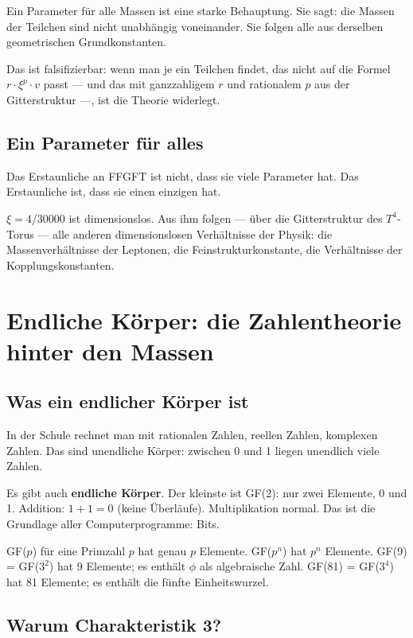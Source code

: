 \documentclass[12pt,oneside]{book}
\begin{document}
Ein Parameter für alle Massen ist eine starke Behauptung. Sie sagt: die Massen der Teilchen sind nicht unabhängig voneinander. Sie folgen alle aus derselben geometrischen Grundkonstanten.

Das ist falsifizierbar: wenn man je ein Teilchen findet, das nicht auf die Formel $r \cdot \xi^p \cdot v$ passt — und das mit ganzzahligem $r$ und rationalem $p$ aus der Gitterstruktur —, ist die Theorie widerlegt.

\section{Ein Parameter für alles}

Das Erstaunliche an FFGFT ist nicht, dass sie viele Parameter hat. Das Erstaunliche ist, dass sie einen einzigen hat.

$\xi = 4/30000$ ist dimensionslos. Aus ihm folgen — über die Gitterstruktur des $T^4$-Torus — alle anderen dimensionslosen Verhältnisse der Physik: die Massenverhältnisse der Leptonen, die Fein\-struktur\-konstante, die Verhältnisse der Kopplungskonstanten.

\chapter{Endliche Körper: die Zahlentheorie hinter den Massen}

\section{Was ein endlicher Körper ist}

In der Schule rechnet man mit rationalen Zahlen, reellen Zahlen, komplexen Zahlen. Das sind unendliche Körper: zwischen 0 und 1 liegen unendlich viele Zahlen.

Es gibt auch \textbf{endliche Körper}. Der kleinste ist GF(2): nur zwei Elemente, 0 und 1. Addition: $1 + 1 = 0$ (keine Überläufe). Multiplikation normal. Das ist die Grundlage aller Computerprogramme: Bits.

GF($p$) für eine Primzahl $p$ hat genau $p$ Elemente. GF($p^n$) hat $p^n$ Elemente. GF(9) = GF($3^2$) hat 9 Elemente; es enthält $\phi$ als algebraische Zahl. GF(81) = GF($3^4$) hat 81 Elemente; es enthält die fünfte Einheitswurzel.

\section{Warum Charakteristik 3?}
\end{document}
